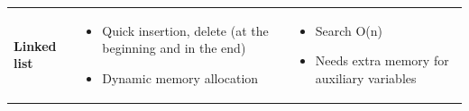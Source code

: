 \documentclass{article}
\begin{document}
\begin{table}[H]
\begin{tabulary}{1.0\textwidth}{L p{0.4\textwidth} p{0.4\textwidth}}
        
        \textbf{Linked list} & \begin{itemize} \item{Quick insertion, delete (at the beginning and in the end)} \item{Dynamic memory allocation} \end{itemize} & \begin{itemize} \item{Search O(n)} \item{Needs extra memory for auxiliary variables} \end{itemize}\\
        

    \end{tabulary}
    \label{table:data_structs}
\end{table}
\end{document}
